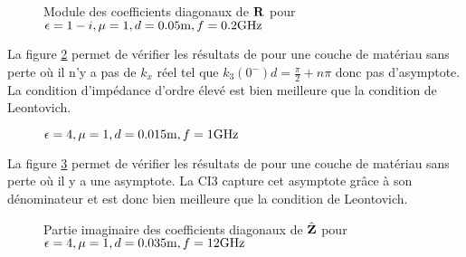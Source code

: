       \begin{figure}[!hbt]
        \centering
        
        \caption[CIOE sur empilement de B.~Stupfel p.~1661]{Module des coefficients diagonaux de \(\mathbf{R}\) pour \(\epsilon = 1-i, \mu = 1, d=0.05\text{m}, f=0.2\text{GHz}\)}
        \label{fig:reflex_fourier:plan:stupfel:hoibc}
      \end{figure}

      La figure \ref{fig:imp_fourier:plan:hoppe:33:hoibc} permet de vérifier les résultats de \cite[p.~33]{hoppe_impedance_1995} pour une couche de matériau sans perte où il n'y a pas de \(k_x\) réel tel que \(k_3(0^-)d=\frac{\pi}{2} + n \pi\) donc pas d'asymptote. La condition d'impédance d'ordre élevé est bien meilleure que la condition de Leontovich.
      \begin{figure}[!hbt]
          \centering
          
          \caption[CIOE sur empilement de Hoppe & Rahmat-Samii p.~33]{\(\epsilon = 4, \mu = 1, d=0.015\text{m}, f=1\text{GHz}\)}
          \label{fig:imp_fourier:plan:hoppe:33:hoibc}
      \end{figure}
      \begin{table}[!hbt]
        \centering
        \caption{Coefficients associés à la figure \ref{fig:imp_fourier:plan:hoppe:33:hoibc}}
        \label{tab:imp_fourier:plan:hoppe:33:hoibc}
      \end{table}

      La figure \ref{fig:imp_fourier:plan:soudais:hoibc} permet de vérifier les résultats de \cite[p.~11]{soudais_3d_2017} pour une couche de matériau sans perte où il y a une asymptote. La CI3 capture cet asymptote grâce à son dénominateur et est donc bien meilleure que la condition de Leontovich.
      \begin{figure}[!hbt]
          \centering
          
          \caption[CIOE sur empilement de P.~Soudais p.~11]{Partie imaginaire des coefficients diagonaux de \(\hat{\mathbf{Z}}\) pour \(\epsilon = 4, \mu = 1, d=0.035\text{m}, f=12\text{GHz}\)}
          \label{fig:imp_fourier:plan:soudais:hoibc}
      \end{figure}
      \begin{table}[!hbt]
        \centering
        \caption{Coefficients associés à la figure \ref{fig:imp_fourier:plan:soudais:hoibc}}
        \label{tab:imp_fourier:plan:soudais:hoibc}
      \end{table}

